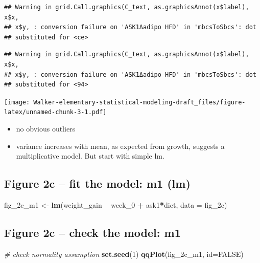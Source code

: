 \documentclass[]{book}
\newenvironment{Shaded}{\begin{snugshade}}{\end{snugshade}}
\newcommand{\CommentTok}[1]{\textcolor[rgb]{0.56,0.35,0.01}{\textit{#1}}}
\newcommand{\DataTypeTok}[1]{\textcolor[rgb]{0.13,0.29,0.53}{#1}}
\newcommand{\DecValTok}[1]{\textcolor[rgb]{0.00,0.00,0.81}{#1}}
\newcommand{\KeywordTok}[1]{\textcolor[rgb]{0.13,0.29,0.53}{\textbf{#1}}}
\newcommand{\NormalTok}[1]{#1}
\newcommand{\OperatorTok}[1]{\textcolor[rgb]{0.81,0.36,0.00}{\textbf{#1}}}
\newcommand{\OtherTok}[1]{\textcolor[rgb]{0.56,0.35,0.01}{#1}}
\newcommand{\StringTok}[1]{\textcolor[rgb]{0.31,0.60,0.02}{#1}}
\providecommand{\tightlist}{%
  \setlength{\itemsep}{0pt}\setlength{\parskip}{0pt}}
\begin{document}
\begin{verbatim}
## Warning in grid.Call.graphics(C_text, as.graphicsAnnot(x$label), x$x,
## x$y, : conversion failure on 'ASK1Δadipo HFD' in 'mbcsToSbcs': dot
## substituted for <ce>
\end{verbatim}

\begin{verbatim}
## Warning in grid.Call.graphics(C_text, as.graphicsAnnot(x$label), x$x,
## x$y, : conversion failure on 'ASK1Δadipo HFD' in 'mbcsToSbcs': dot
## substituted for <94>
\end{verbatim}

\texttt{[image: Walker-elementary-statistical-modeling-draft\_files/figure-latex/unnamed-chunk-3-1.pdf]}

\begin{itemize}
\tightlist
\item
  no obvious outliers
\item
  variance increases with mean, as expected from growth, suggests a multiplicative model. But start with simple lm.
\end{itemize}

\hypertarget{figure-2c-fit-the-model-m1-lm}{%
\subsection{Figure 2c -- fit the model: m1 (lm)}\label{figure-2c-fit-the-model-m1-lm}}

\begin{Shaded}
\begin{Highlighting}[]
\NormalTok{fig_2c_m1 <-}\StringTok{ }\KeywordTok{lm}\NormalTok{(weight_gain }\OperatorTok{~}\StringTok{ }\NormalTok{week_}\DecValTok{0} \OperatorTok{+}\StringTok{ }\NormalTok{ask1}\OperatorTok{*}\NormalTok{diet, }\DataTypeTok{data =}\NormalTok{ fig_2c)}
\end{Highlighting}
\end{Shaded}

\hypertarget{figure-2c-check-the-model-m1}{%
\subsection{Figure 2c -- check the model: m1}\label{figure-2c-check-the-model-m1}}

\begin{Shaded}
\begin{Highlighting}[]
\CommentTok{# check normality assumption}
\KeywordTok{set.seed}\NormalTok{(}\DecValTok{1}\NormalTok{)}
\KeywordTok{qqPlot}\NormalTok{(fig_2c_m1, }\DataTypeTok{id=}\OtherTok{FALSE}\NormalTok{)}
\end{Highlighting}
\end{Shaded}
\end{document}
